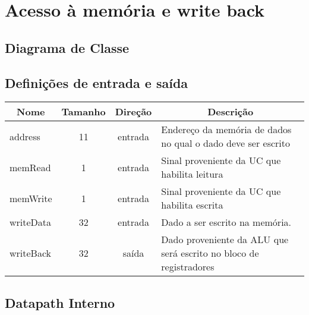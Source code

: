 \section{Acesso à memória e write back}
	\subsection{Diagrama de Classe}
  \begin{figure}[H]
    
  \end{figure}

\subsection{Definições de entrada e saída}

	\begin{center}
        \begin{longtable}[pos]{| l | c | c | m{7cm} |} \hline
          \multicolumn{1}{|c|}{\cellcolor[gray]{0.9}\textbf{Nome}} & 
          \multicolumn{1}{c|}{\cellcolor[gray]{0.9}\textbf{Tamanho}} & 
          \multicolumn{1}{c|}{\cellcolor[gray]{0.9}\textbf{Direção}} &
          \multicolumn{1}{c|}{\cellcolor[gray]{0.9}\textbf{Descrição}} \\ \hline
          \endhead
          \hline
          \endlastfoot

          address                  & 11  & entrada   & Endereço da memória de dados no qual o dado deve ser escrito   \\ \hline
          memRead                  & 1   & entrada   & Sinal proveniente da UC que habilita leitura    \\ \hline
          memWrite                 & 1   & entrada   & Sinal proveniente da UC que habilita escrita    \\ \hline
          writeData      		   & 32   & entrada   & Dado a ser escrito na memória. \\ \hline
          writeBack	               & 32  & saída     & Dado proveniente da ALU que será escrito no bloco de registradores\\ \hline
        \end{longtable}
      \end{center}
      
\subsection{Datapath Interno}
	
	\begin{figure}[ht]
		\begin{center}
		\end{center}
	\end{figure}